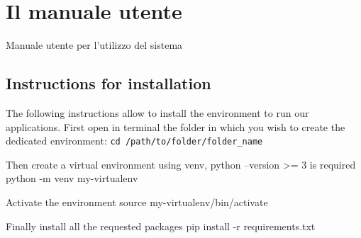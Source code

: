 \chapter{Il manuale utente}
\label{appendiceD}
\thispagestyle{empty}

\noindent Manuale utente per l'utilizzo del sistema


\section{Instructions for installation}

The following instructions allow to install the environment to run our applications. 
First open in terminal the folder in which you wish to create the dedicated environment:
\verb|cd /path/to/folder/folder_name|


Then create a virtual environment using venv, python --version >= 3 is required
python -m venv my-virtualenv

Activate the environment
source my-virtualenv/bin/activate

Finally  install all the requested packages 
pip install -r requirements.txt

